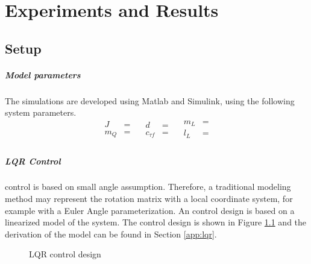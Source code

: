 \chapter{Experiments and Results}\label{ch:results}

\section{Setup}
\paragraph{Model parameters}
The simulations are developed using Matlab and Simulink, using the following system parameters.
\begin{equation}\label{key}
\begin{aligned}
J&=\\
m_Q&=\\
\nonumber
\end{aligned}
\quad
\begin{aligned}
d&=\\
c_{\tau f}&=\\
\nonumber
\end{aligned}
\quad
\begin{aligned}
m_L&=\\
l_L&=\\
\nonumber
\end{aligned}
\end{equation}

\paragraph{LQR Control}
 control is based on small angle assumption. Therefore, a traditional modeling method may represent the rotation matrix with a local coordinate system, for example with a Euler Angle parameterization. An  control design is based on a linearized model of the system. The control design is shown in Figure \ref{fig:set.lqr} and the derivation of the model can be found in Section \ref{app:lqr}.
\begin{figure}[h!]
	\centering
	\caption{LQR control design\label{fig:set.lqr}}
\end{figure}		

